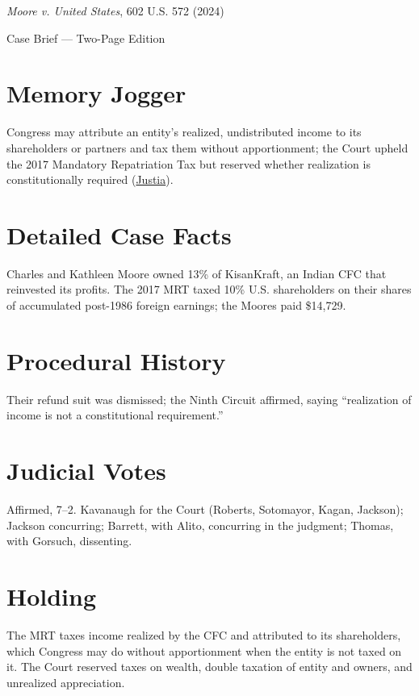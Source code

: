 \documentclass[12pt]{article}
\begin{document}
\begin{center}
{\LARGE \textit{Moore v. United States}, 602 U.S. 572 (2024)\par}
\vspace{0.5em}
{\large Case Brief --- Two-Page Edition\par}
\end{center}

\section{Memory Jogger}
Congress may attribute an entity's realized, undistributed income to its shareholders or partners and tax them without apportionment; the Court upheld the 2017 Mandatory Repatriation Tax but reserved whether realization is constitutionally required (\href{https://supreme.justia.com/cases/federal/us/602/22-800/}{Justia}).

\section{Detailed Case Facts}
Charles and Kathleen Moore owned 13\% of KisanKraft, an Indian CFC that reinvested its profits. The 2017 MRT taxed 10\% U.S. shareholders on their shares of accumulated post-1986 foreign earnings; the Moores paid \$14,729.

\section{Procedural History}
Their refund suit was dismissed; the Ninth Circuit affirmed, saying ``realization of income is not a constitutional requirement.''

\section{Judicial Votes}
Affirmed, 7--2. Kavanaugh for the Court (Roberts, Sotomayor, Kagan, Jackson); Jackson concurring; Barrett, with Alito, concurring in the judgment; Thomas, with Gorsuch, dissenting.

\section{Holding}
The MRT taxes income realized by the CFC and attributed to its shareholders, which Congress may do without apportionment when the entity is not taxed on it. The Court reserved taxes on wealth, double taxation of entity and owners, and unrealized appreciation.
\end{document}
